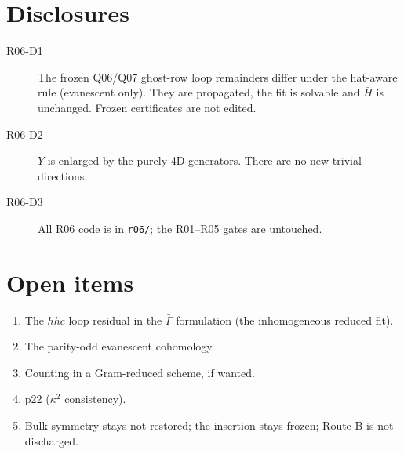 \documentclass[11pt]{article}
\begin{document}
\section{Disclosures}
\begin{description}
\item[R06-D1] The frozen Q06/Q07 ghost-row loop remainders differ under the hat-aware rule (evanescent only). They are
propagated, the fit is solvable and $\bar H$ is unchanged. Frozen certificates are not edited.
\item[R06-D2] $Y$ is enlarged by the purely-4D generators. There are no new trivial directions.
\item[R06-D3] All R06 code is in \texttt{r06/}; the R01--R05 gates are untouched.
\end{description}

\section{Open items}
\begin{enumerate}
\item The $hhc$ loop residual in the $\bar\Gamma$ formulation (the inhomogeneous reduced fit).
\item The parity-odd evanescent cohomology.
\item Counting in a Gram-reduced scheme, if wanted.
\item p22 ($\kappa^2$ consistency).
\item Bulk symmetry stays not restored; the insertion stays frozen; Route B is not discharged.
\end{enumerate}
\end{document}
